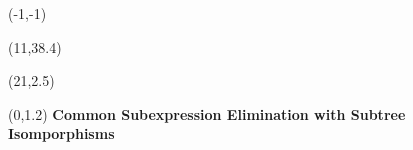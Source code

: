 \documentclass[landscape]{a0poster}
\def\Title#1{\noindent\textbf{{\VeryHuge\color{Red} #1}}}
\begin{document}

\begin{textblock}{20}(-1,-1) 
\end{textblock} 

\begin{textblock}{20}(11,38.4) 
\end{textblock} 

\begin{textblock}{2}(21,2.5) %
\end{textblock} %








\begin{textblock}{25}(0,1.2) %
	\Title{Common Subexpression Elimination with Subtree Isomporphisms }
\end{textblock} %
\end{document}
